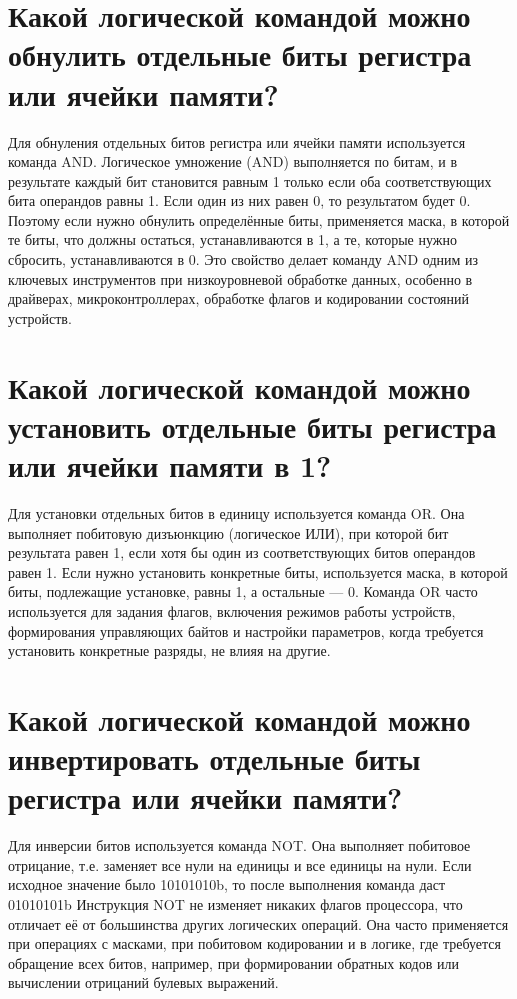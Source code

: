 \section{ Какой логической командой можно обнулить отдельные биты регистра или ячейки памяти?}

Для обнуления отдельных битов регистра или ячейки памяти используется команда AND. Логическое умножение (AND) выполняется по битам, и в результате каждый бит становится равным 1 только если оба соответствующих бита операндов равны 1. Если один из них равен 0, то результатом будет 0.
Поэтому если нужно обнулить определённые биты, применяется маска, в которой те биты, что должны остаться, устанавливаются в 1, а те, которые нужно сбросить, устанавливаются в 0.
Это свойство делает команду AND одним из ключевых инструментов при низкоуровневой обработке данных, особенно в драйверах, микроконтроллерах, обработке флагов и кодировании состояний устройств.

\section{Какой логической командой можно установить отдельные биты регистра или ячейки памяти в 1?}

Для установки отдельных битов в единицу используется команда OR. Она выполняет побитовую дизъюнкцию (логическое ИЛИ), при которой бит результата равен 1, если хотя бы один из соответствующих битов операндов равен 1.
Если нужно установить конкретные биты, используется маска, в которой биты, подлежащие установке, равны 1, а остальные — 0.
Команда OR часто используется для задания флагов, включения режимов работы устройств, формирования управляющих байтов и настройки параметров, когда требуется установить конкретные разряды, не влияя на другие.

\section{Какой логической командой можно инвертировать отдельные биты регистра или ячейки памяти?}

Для инверсии битов используется команда NOT. Она выполняет побитовое отрицание, т.е. заменяет все нули на единицы и все единицы на нули. Если исходное значение было 10101010b, то после выполнения команда даст 01010101b
Инструкция NOT не изменяет никаких флагов процессора, что отличает её от большинства других логических операций. Она часто применяется при операциях с масками, при побитовом кодировании и в логике, где требуется обращение всех битов, например, при формировании обратных кодов или вычислении отрицаний булевых выражений.

